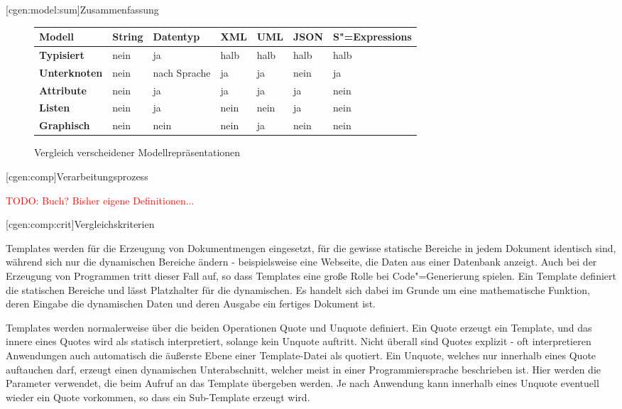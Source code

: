 \documentclass[a4paper, bibgerm]{book}
\newcommand{\todo}[1]{
  \textcolor{red}{TODO: #1}
}
\newcommand\lsection{}
\newcommand\lsubsection{}
\newcommand{\sexps}{S"=Expressions}
\newcommand{\cgen}{Code"=Generierung}
\begin{document}
\lsubsection[cgen:model:sum]{Zusammenfassung}

\begin{figure}[htp]
  \centering
\begin{tabular}{|l|l|l|l|l|l|l|}\hline
\bf Modell      & \bf String & \bf Datentyp & \bf XML & \bf UML & \bf JSON & \bf \sexps{} \\\hline\hline
\bf Typisiert   & nein       & ja           & halb    & halb    & halb     & halb         \\\hline
\bf Unterknoten & nein       & nach Sprache & ja      & ja      & nein     & ja           \\\hline
\bf Attribute   & nein       & ja           & ja      & ja      & ja       & nein         \\\hline
\bf Listen      & nein       & ja           & nein    & nein    & ja       & nein         \\\hline
\bf Graphisch   & nein       & nein         & nein    & ja      & nein     & nein         \\\hline
\end{tabular}  
  \caption{Vergleich verscheidener Modellrepräsentationen}
\end{figure}

\lsection[cgen:comp]{Verarbeitungsprozess}

\todo{Buch? Bisher eigene Definitionen...}

\lsubsection[cgen:comp:crit]{Vergleichskriterien}

Templates werden für die Erzeugung von Dokumentmengen eingesetzt, für
die gewisse statische Bereiche in jedem Dokument identisch sind, während
sich nur die dynamischen Bereiche ändern - beispielsweise eine Webseite,
die Daten aus einer Datenbank anzeigt. Auch bei der Erzeugung von
Programmen tritt dieser Fall auf, so dass Templates eine große Rolle bei
\cgen{} spielen. Ein Template definiert die
statischen Bereiche und lässt Platzhalter für die dynamischen. Es
handelt sich dabei im Grunde um eine mathematische Funktion, deren
Eingabe die dynamischen Daten und deren Ausgabe ein fertiges Dokument
ist.

Templates werden normalerweise über die beiden Operationen Quote und
Unquote definiert. Ein Quote erzeugt ein Template, und das innere eines
Quotes wird als statisch interpretiert, solange kein Unquote
auftritt. Nicht überall sind Quotes explizit - oft interpretieren
Anwendungen auch automatisch die äußerste Ebene einer Template-Datei als
quotiert. Ein Unquote, welches nur innerhalb eines Quote auftauchen
darf, erzeugt einen dynamischen Unterabschnitt, welcher meist in einer
Programmiersprache beschrieben ist. Hier werden die Parameter verwendet,
die beim Aufruf an das Template übergeben werden. Je nach Anwendung kann
innerhalb eines Unquote eventuell wieder ein Quote vorkommen, so dass
ein Sub-Template erzeugt wird.
\end{document}
